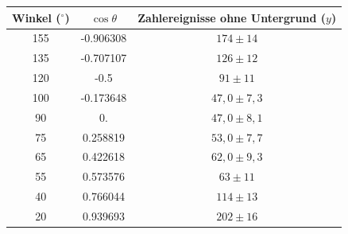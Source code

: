 \documentclass[prb,12pt]{revtex4-2}
\theoremstyle{definition}
\theoremstyle{definition}
\begin{document}
\begin{center}
	\begin{tabular}{ccc}
	\toprule
	\textbf{Winkel ($^\circ$)} & $\cos\theta$ & \textbf{Zahlereignisse ohne Untergrund ($y$)}\\\midrule
		155 & -0.906308 & $174 \pm 14$ \\\midrule
135 & -0.707107 & $126 \pm 12$ \\\midrule
120 & -0.5 & $91 \pm 11$ \\\midrule
100 & -0.173648 & $47,0 \pm 7,3$ \\\midrule
90 & 0. & $47,0 \pm 8,1$ \\\midrule
75 & 0.258819 & $53,0 \pm 7,7$ \\\midrule
65 & 0.422618 & $62,0 \pm 9,3$ \\\midrule
55 & 0.573576 & $63 \pm 11$ \\\midrule
40 & 0.766044 & $114 \pm 13$ \\\midrule
20 & 0.939693 & $202 \pm 16$ \\\bottomrule
\end{tabular}
\end{center}
\end{document}
